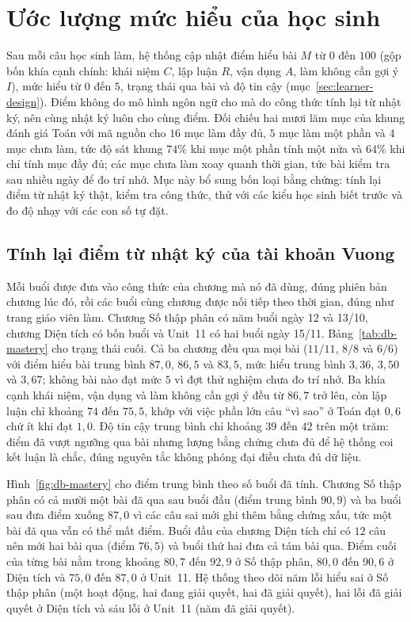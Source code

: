 \section{Ước lượng mức hiểu của học sinh}\label{sec:eval-learner}

Sau mỗi câu học sinh làm, hệ thống cập nhật điểm hiểu bài $M$ từ $0$ đến $100$ (gộp bốn khía cạnh chính: khái niệm $C$, lập luận $R$, vận dụng $A$, làm không cần gợi ý $I$), mức hiểu từ $0$ đến $5$, trạng thái qua bài và độ tin cậy (mục~\ref{sec:learner-design}). Điểm không do mô hình ngôn ngữ cho mà do công thức tính lại từ nhật ký, nên cùng nhật ký luôn cho cùng điểm. Đối chiếu hai mươi lăm mục của khung đánh giá Toán với mã nguồn cho $16$ mục làm đầy đủ, $5$ mục làm một phần và $4$ mục chưa làm, tức độ sát khung $74\%$ khi mục một phần tính một nửa và $64\%$ khi chỉ tính mục đầy đủ; các mục chưa làm xoay quanh thời gian, tức bài kiểm tra sau nhiều ngày để đo trí nhớ. Mục này bổ sung bốn loại bằng chứng: tính lại điểm từ nhật ký thật, kiểm tra công thức, thử với các kiểu học sinh biết trước và đo độ nhạy với các con số tự đặt.

\subsection{Tính lại điểm từ nhật ký của tài khoản Vuong}
Mỗi buổi được đưa vào công thức của chương mà nó đã dùng, đúng phiên bản chương lúc đó, rồi các buổi cùng chương được nối tiếp theo thời gian, đúng như trang giáo viên làm. Chương Số thập phân có năm buổi ngày 12 và 13/10, chương Diện tích có bốn buổi và Unit~11 có hai buổi ngày 15/11. Bảng~\ref{tab:db-mastery} cho trạng thái cuối. Cả ba chương đều qua mọi bài ($11/11$, $8/8$ và $6/6$) với điểm hiểu bài trung bình $87{,}0$, $86{,}5$ và $83{,}5$, mức hiểu trung bình $3{,}36$, $3{,}50$ và $3{,}67$; không bài nào đạt mức $5$ vì đợt thử nghiệm chưa đo trí nhớ. Ba khía cạnh khái niệm, vận dụng và làm không cần gợi ý đều từ $86{,}7$ trở lên, còn lập luận chỉ khoảng $74$ đến $75{,}5$, khớp với việc phần lớn câu ``vì sao'' ở Toán đạt $0{,}6$ chứ ít khi đạt $1{,}0$. Độ tin cậy trung bình chỉ khoảng $39$ đến $42$ trên một trăm: điểm đã vượt ngưỡng qua bài nhưng lượng bằng chứng chưa đủ để hệ thống coi kết luận là chắc, đúng nguyên tắc không phóng đại điều chưa đủ dữ liệu.



Hình~\ref{fig:db-mastery} cho điểm trung bình theo số buổi đã tính. Chương Số thập phân có cả mười một bài đã qua sau buổi đầu (điểm trung bình $90{,}9$) và ba buổi sau đưa điểm xuống $87{,}0$ vì các câu sai mới ghi thêm bằng chứng xấu, tức một bài đã qua vẫn có thể mất điểm. Buổi đầu của chương Diện tích chỉ có $12$ câu nên mới hai bài qua (điểm $76{,}5$) và buổi thứ hai đưa cả tám bài qua. Điểm cuối của từng bài nằm trong khoảng $80{,}7$ đến $92{,}9$ ở Số thập phân, $80{,}0$ đến $90{,}6$ ở Diện tích và $75{,}0$ đến $87{,}0$ ở Unit~11. Hệ thống theo dõi năm lỗi hiểu sai ở Số thập phân (một hoạt động, hai đang giải quyết, hai đã giải quyết), hai lỗi đã giải quyết ở Diện tích và sáu lỗi ở Unit~11 (năm đã giải quyết).

